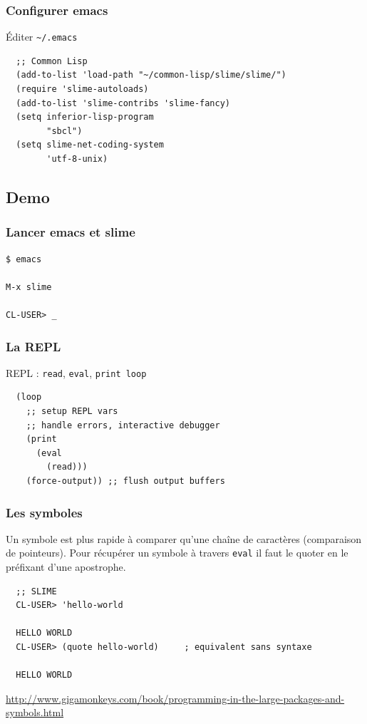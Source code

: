 \documentclass[8pt]{beamer}
\begin{document}
\begin{frame}[fragile]
  \frametitle{Configurer emacs}
  Éditer \tt{\textasciitilde/.emacs}
\begin{verbatim}
  ;; Common Lisp
  (add-to-list 'load-path "~/common-lisp/slime/slime/")
  (require 'slime-autoloads)
  (add-to-list 'slime-contribs 'slime-fancy)
  (setq inferior-lisp-program
        "sbcl")
  (setq slime-net-coding-system
        'utf-8-unix)
\end{verbatim}
\end{frame}

\subsection{Demo}

\begin{frame}[fragile]
  \frametitle{Lancer emacs et slime}
\begin{verbatim}
$ emacs

M-x slime

CL-USER> _
\end{verbatim}
\end{frame}

\begin{frame}[fragile]
  \frametitle{La REPL}
  REPL : {\tt read}, {\tt eval}, {\tt print loop}
\begin{verbatim}
  (loop
    ;; setup REPL vars
    ;; handle errors, interactive debugger
    (print
      (eval
        (read)))
    (force-output)) ;; flush output buffers
\end{verbatim}
\end{frame}

\begin{frame}[fragile]
  \frametitle{Les symboles}
  Un symbole est plus rapide à comparer qu'une chaîne de caractères
  (comparaison de pointeurs).
  Pour récupérer un symbole à travers {\tt eval} il faut le quoter en le préfixant d'une apostrophe.
\begin{verbatim}
  ;; SLIME
  CL-USER> 'hello-world
  
  HELLO WORLD
  CL-USER> (quote hello-world)     ; equivalent sans syntaxe
  
  HELLO WORLD
\end{verbatim}
  \vspace{1em}
  \url{http://www.gigamonkeys.com/book/programming-in-the-large-packages-and-symbols.html}
\end{frame}
\end{document}
